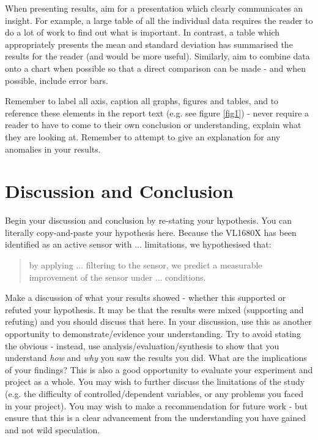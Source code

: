\documentclass[conference]{IEEEtran}
\begin{document}
When presenting results, aim for a presentation which clearly communicates an insight. For example, a large table of all the individual data requires the reader to do a lot of work to find out what is important.  In contrast, a table which appropriately presents the mean and standard deviation has summarised the results for the reader (and would be more useful).  Similarly, aim to combine data onto a chart when possible so that a direct comparison can be made - and when possible, include error bars.  


Remember to label all axis, caption all graphs, figures and tables, and to reference these elements in the report text (e.g. see figure \ref{fig1}) - never require a reader to have to come to their own conclusion or understanding, explain what they are looking at.  Remember to attempt to give an explanation for any anomalies in your results.  


\section{Discussion and Conclusion}
Begin your discussion and conclusion by re-stating your hypothesis.  You can literally copy-and-paste your hypothesis here.  
Because the VL1680X has been identified as an active sensor with ... limitations, we hypothesised that:
\begin{quote}
    by applying ... filtering to the sensor, we predict a measurable improvement of the sensor under ... conditions.  
\end{quote}
Make a discussion of what your results showed - whether this supported or refuted your hypothesis.  It may be that the results were mixed (supporting and refuting) and you should discuss that here. In your discussion, use this as another opportunity to demonstrate/evidence your understanding. Try to avoid stating the obvious - instead, use analysis/evaluation/synthesis to show that you understand \emph{how} and \emph{why} you saw the results you did.  What are the implications of your findings?  
This is also a good opportunity to evaluate your experiment and project as a whole.  You may wish to further discuss the limitations of the study (e.g. the difficulty of controlled/dependent variables, or any problems you faced in your project).  You may wish to make a recommendation for future work - but ensure that this is a clear advancement from the understanding you have gained and not wild speculation.


 

\end{document}
